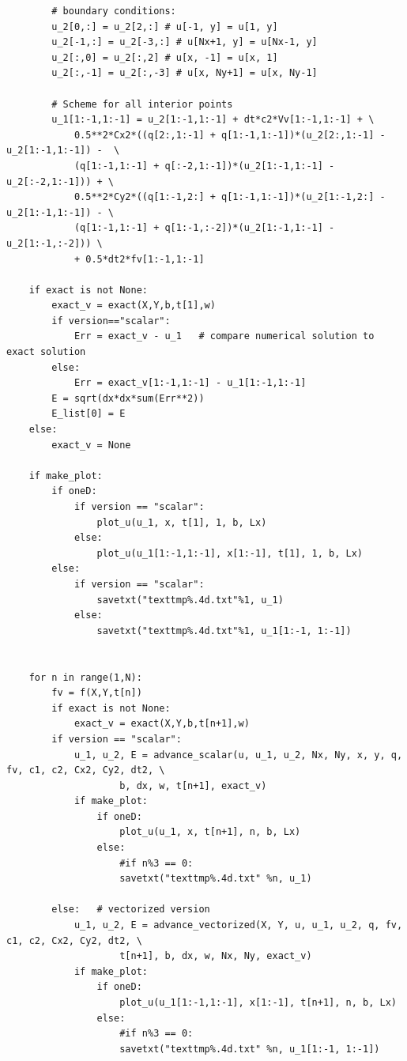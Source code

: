 \documentclass[twoside]{article}
\begin{document}
\begin{verbatim}
        # boundary conditions:
        u_2[0,:] = u_2[2,:] # u[-1, y] = u[1, y]
        u_2[-1,:] = u_2[-3,:] # u[Nx+1, y] = u[Nx-1, y]
        u_2[:,0] = u_2[:,2] # u[x, -1] = u[x, 1]
        u_2[:,-1] = u_2[:,-3] # u[x, Ny+1] = u[x, Ny-1]
        
        # Scheme for all interior points
        u_1[1:-1,1:-1] = u_2[1:-1,1:-1] + dt*c2*Vv[1:-1,1:-1] + \
            0.5**2*Cx2*((q[2:,1:-1] + q[1:-1,1:-1])*(u_2[2:,1:-1] - u_2[1:-1,1:-1]) -  \
            (q[1:-1,1:-1] + q[:-2,1:-1])*(u_2[1:-1,1:-1] - u_2[:-2,1:-1])) + \
            0.5**2*Cy2*((q[1:-1,2:] + q[1:-1,1:-1])*(u_2[1:-1,2:] - u_2[1:-1,1:-1]) - \
            (q[1:-1,1:-1] + q[1:-1,:-2])*(u_2[1:-1,1:-1] - u_2[1:-1,:-2])) \
            + 0.5*dt2*fv[1:-1,1:-1]
                
    if exact is not None:  
        exact_v = exact(X,Y,b,t[1],w)  
        if version=="scalar":
            Err = exact_v - u_1   # compare numerical solution to exact solution
        else:
            Err = exact_v[1:-1,1:-1] - u_1[1:-1,1:-1]
        E = sqrt(dx*dx*sum(Err**2))
        E_list[0] = E
    else:
        exact_v = None
    
    if make_plot:
        if oneD:
            if version == "scalar":
                plot_u(u_1, x, t[1], 1, b, Lx)
            else:
                plot_u(u_1[1:-1,1:-1], x[1:-1], t[1], 1, b, Lx)
        else:
            if version == "scalar":
                savetxt("texttmp%.4d.txt"%1, u_1)
            else:
                savetxt("texttmp%.4d.txt"%1, u_1[1:-1, 1:-1])
   

    for n in range(1,N):
        fv = f(X,Y,t[n])
        if exact is not None:
            exact_v = exact(X,Y,b,t[n+1],w)
        if version == "scalar":
            u_1, u_2, E = advance_scalar(u, u_1, u_2, Nx, Ny, x, y, q, fv, c1, c2, Cx2, Cy2, dt2, \ 
            		b, dx, w, t[n+1], exact_v)
            if make_plot:
                if oneD:
                    plot_u(u_1, x, t[n+1], n, b, Lx)
                else:
                    #if n%3 == 0:
                    savetxt("texttmp%.4d.txt" %n, u_1)
                    
        else:   # vectorized version
            u_1, u_2, E = advance_vectorized(X, Y, u, u_1, u_2, q, fv, c1, c2, Cx2, Cy2, dt2, \
            		t[n+1], b, dx, w, Nx, Ny, exact_v)
            if make_plot:
                if oneD:
                    plot_u(u_1[1:-1,1:-1], x[1:-1], t[n+1], n, b, Lx)
                else:
                    #if n%3 == 0:
                    savetxt("texttmp%.4d.txt" %n, u_1[1:-1, 1:-1])
        

\end{verbatim}
\end{document}
